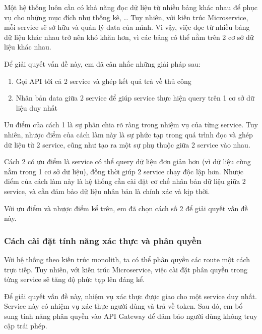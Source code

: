 \documentclass[./../main.tex]{subfiles}
\begin{document}
Một hệ thống luôn cần có khả năng đọc dữ liệu từ nhiều bảng khác nhau để
phục vụ cho những mục đích như thống kê, \ldots{} Tuy nhiên, với kiến
trúc Microservice, mỗi service sẽ sở hữu và quản lý data của mình. Vì
vậy, việc đọc từ nhiều bảng dữ liệu khác nhau trở nên khó khăn hơn, vì
các bảng có thể nằm trên 2 cơ sở dữ liệu khác nhau.

Để giải quyết vấn đề này, em đã cân nhắc những giải pháp sau:

\begin{enumerate}
\def\labelenumi{\arabic{enumi}.}
\item
  
  Gọi API tới cả 2 service và ghép kết quả trả về thủ công
  
\item
  
  Nhân bản data giữa 2 service để giúp service thực hiện query trên 1 cơ
  sở dữ liệu duy nhất
  
\end{enumerate}

Ưu điểm của cách 1 là sự phân chia rõ ràng trong nhiệm vụ của từng
service. Tuy nhiên, nhược điểm của cách làm này là sự phức tạp trong quá
trình đọc và ghép dữ liệu từ 2 service, cũng như tạo ra một sự phụ thuộc
giữa 2 service vào nhau.

Cách 2 có ưu điểm là service có thể query dữ liệu đơn giản hơn (vì dữ
liệu cùng nằm trong 1 cơ sở dữ liệu), đồng thời giúp 2 service chạy độc
lập hơn. Nhược điểm của cách làm này là hệ thống cần cài đặt cơ chế nhân
bản dữ liệu giữa 2 service, và cần đảm bảo dữ liệu nhân bản là chính xác
và kịp thời.

Với ưu điểm và nhược điểm kể trên, em đã chọn cách số 2 để giải quyết
vấn đề này.

\hypertarget{cuxe1ch-cuxe0i-ux111ux1eb7t-tuxednh-nux103ng-xuxe1c-thux1ef1c-vuxe0-phuxe2n-quyux1ec1n}{%
\subsubsection{Cách cài đặt tính năng xác thực và phân
quyền}\label{cuxe1ch-cuxe0i-ux111ux1eb7t-tuxednh-nux103ng-xuxe1c-thux1ef1c-vuxe0-phuxe2n-quyux1ec1n}}

Với hệ thống theo kiến trúc monolith, ta có thể phân quyền các route một
cách trực tiếp. Tuy nhiên, với kiến trúc Microservice, việc cài đặt phân
quyền trong từng service sẽ tăng độ phức tạp lên đáng kể.

Để giải quyết vấn đề này, nhiệm vụ xác thực được giao cho một
service duy nhất. Service này có nhiệm vụ xác thực người dùng và trả về
token. Sau đó, em bổ sung tính năng phân quyền vào API Gateway để đảm
bảo người dùng không truy cập trái phép.
\end{document}
